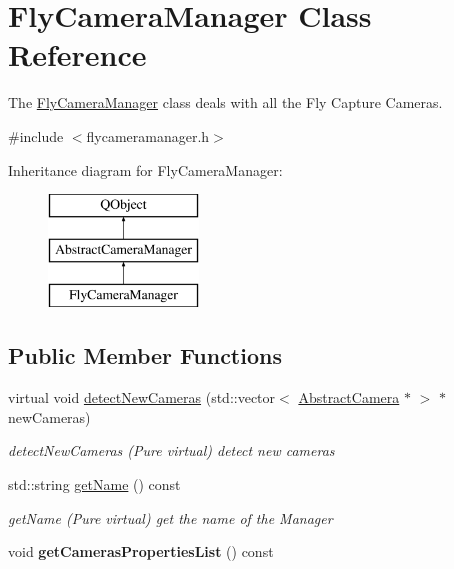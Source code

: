 \hypertarget{class_fly_camera_manager}{\section{Fly\-Camera\-Manager Class Reference}
\label{class_fly_camera_manager}
}


The \hyperlink{class_fly_camera_manager}{Fly\-Camera\-Manager} class deals with all the Fly Capture Cameras.  




{\ttfamily \#include $<$flycameramanager.\-h$>$}

Inheritance diagram for Fly\-Camera\-Manager\-:\begin{figure}[H]
\begin{center}
\leavevmode
\includegraphics[height=3.000000cm]{class_fly_camera_manager}
\end{center}
\end{figure}
\subsection*{Public Member Functions}
\begin{DoxyCompactItemize}
\item 
virtual void \hyperlink{class_fly_camera_manager_aab72966a50baaf966817c7f1265341a8}{detect\-New\-Cameras} (std\-::vector$<$ \hyperlink{class_abstract_camera}{Abstract\-Camera} $\ast$ $>$ $\ast$new\-Cameras)
\begin{DoxyCompactList}\small\item\em detect\-New\-Cameras (Pure virtual) detect new cameras \end{DoxyCompactList}\item 
std\-::string \hyperlink{class_fly_camera_manager_a1c865e44bde9cc91829c3e875081396d}{get\-Name} () const 
\begin{DoxyCompactList}\small\item\em get\-Name (Pure virtual) get the name of the Manager \end{DoxyCompactList}\item 
\hypertarget{class_fly_camera_manager_acf0d67c5a686a2d48ebd0e20a303165e}{void {\bfseries get\-Cameras\-Properties\-List} () const }\label{class_fly_camera_manager_acf0d67c5a686a2d48ebd0e20a303165e}

\end{DoxyCompactItemize}
